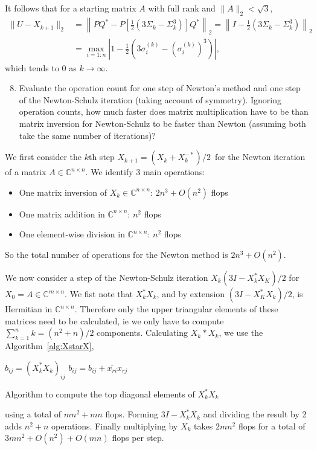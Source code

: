 \documentclass[10pt, A4paper]{article}
\newcommand{\mxn}{m \times n}
\newcommand{\nxn}{n \times n}
\begin{document}
It follows that for a starting matrix $A$ with full rank and $\|A\|_2 < 
\sqrt{3}$,
\begin{align}
	\|U-X_{k+1}\|_2 &= \left\|PQ^* - P\left[\frac{1}{2}(3 \Sigma_k
	-\Sigma_k^3)\right] Q^*\right\|_2
	= \left\|I - \frac{1}{2}(3\Sigma_k - \Sigma_k^3)\right\|_2 \\
	&= \max_{i = 1:n} \left|1 - \frac{1}{2}\left(3 \sigma_i^{(k)} - 
	(\sigma_i^{(k)})^3\right)\right|,
\end{align}
which tends to 0 as $k \to \infty$.





\vspace{0.2cm}
\begin{enumerate}
	\setcounter{enumi}{7}
	\item Evaluate the operation count for one step of Newton's 
	method and one step of the Newton\nobreakdash-Schulz iteration (taking
	account of symmetry). Ignoring operation counts, how much faster
	does matrix multiplication have to be than matrix inversion for
	Newton\nobreakdash-Schulz to be faster than Newton (assuming both take the same number of iterations)?
\end{enumerate}

We first consider the $k$th step $X_{k+1} = (X_k + X_k^{-*})/2\,$ for 
the Newton iteration of a matrix $A \in \mathbb{C}^{n\times n}$. We 
identify 3 main operations:
\begin{itemize}
	\item One matrix inversion of $X_k \in \mathbb{C}^{\nxn}$: 
	\hfill
	$2n^3 + O(n^2)$ flops
	
	\item One matrix addition in $\mathbb{C}^{\nxn}$:
	\hfill
	$n^2$ flops
	
	\item One element-wise division in $\mathbb{C}^{\nxn}$:
	\hfill
	$n^2$ flops
\end{itemize}
So the total number of operations for the Newton method is $2n^3 + 
O(n^2)$.

We now consider a step of the Newton-Schulz iteration $X_k(3I - 
X_k^*X_K)/2$ for $X_0 = A \in \mathbb{C}^{\mxn}$.
We fist note that $X_k^*X_k$, and by extension $(3I - X_K^*X_k)/2$, is 
Hermitian in $\mathbb{C}^{\nxn}$.
Therefore only the upper triangular elements of these matrices need to 
be calculated, ie we only have to compute $\sum_{k=1}^{n} k= (n^2+n)/2$ 
components.
Calculating $X_k*X_k$, we use the Algorithm~\ref{alg:XstarX},
\begin{algorithm}
	$b_{ij} = (X_k^*X_k)_{ij}$ \;
	{
		{
				{
					$b_{ij} = b_{ij} + \overline{x_{ri}}x_{rj}$ \;
				}
		}
	}
	\caption{Algorithm to compute the top diagonal elements of 
	$X_k^*X_k$}
	\label{alg:XstarX}
\end{algorithm}
using a total of $mn^2 + mn$ flops. Forming $3I - X_k^*X_k$ and 
dividing the result by 2 adds $n^2 + n$ operations. Finally multiplying 
by $X_k$ takes $2mn^2$ flops for a total of $3mn^2 + O(n^2) + O(mn)$ 
flops per step.
\end{document}
